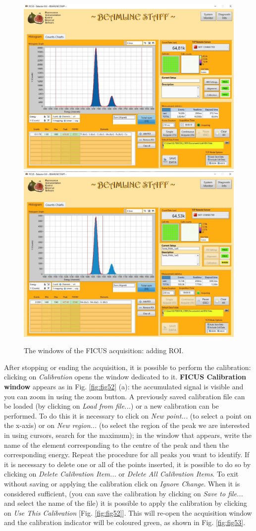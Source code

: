 \documentclass[a4paper,12pt,oneside,pdflatex,italian,final,twocolumn]{article}
\begin{document}
\begin{figure}[h!]
\centering
\subfloat
{\includegraphics[width=.48\textwidth]{Cattura97.jpg}} \quad
\subfloat
{\includegraphics[width=.48\textwidth]{Cattura98.jpg}} \\
\caption{The windows of the FICUS acquisition: adding ROI.}\label{fig:fig51bis}
\end{figure}

After stopping or ending the acquisition, it is possible to perform the calibration: clicking on \textit{Calibration} opens the window dedicated to it. \textbf{FICUS Calibration window} appears as in Fig.  \ref{fig:fig52} (a): the accumulated signal is visible and you can zoom in using the zoom button.
A previously saved calibration file can be loaded (by clicking on \textit{Load from file...}) or a new calibration can be performed. To do this it is necessary to click on \textit{New point...} (to select a point on the x-axis) or on \textit{New region...} (to select the region of the peak we are interested in using cursors, search for the maximum); in the window that appears, write the name of the element corresponding to the centre of the peak and then the corresponding energy.
Repeat the procedure for all peaks you want to identify. If it is necessary to delete one or all of the points inserted, it is possible to do so by clicking on \textit{Delete Calibration Item...} or \textit{Delete All Calibration Items}. To exit without saving or applying the calibration click on \textit{Ignore Change}. When it is considered sufficient, (you can save the calibration by clicking on \textit{Save to file...} and select the name of the file) it is possible to apply the calibration by clicking on \textit{Use This Calibration} [Fig.  \ref{fig:fig52}]. This will re-open the acquisition window and the calibration indicator will be coloured green, as shown in Fig. \ref{fig:fig53}.
\end{document}
